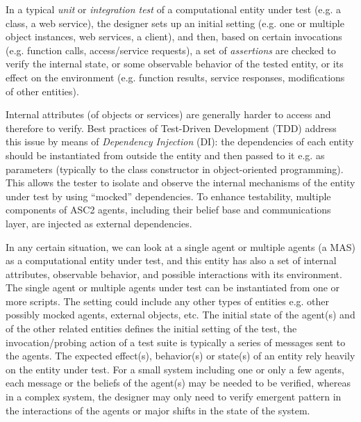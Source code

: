 
In a typical \textit{unit} or \textit{integration test} of a computational entity under test (e.g. a class, a web service), the designer sets up an initial setting (e.g. one or multiple object instances, web services, a client), and then, based on certain invocations (e.g. function calls, access/service requests), a set of \textit{assertions} are checked to verify the internal state, or some observable behavior of the tested entity, or its effect on the environment (e.g. function results, service responses, modifications of other entities). 

Internal attributes (of objects or services) are generally harder to access and therefore to verify. Best practices of Test-Driven Development (TDD) address this issue by means of \textit{Dependency Injection} (DI): the dependencies of each entity should be instantiated from outside the entity and then passed to it e.g. as parameters (typically to the class constructor in object-oriented programming). %
This allows the tester to isolate and observe the internal mechanisms of the entity under test by using ``mocked'' dependencies. 
To enhance testability, multiple components of ASC2 agents, including their belief base and communications layer, are injected as external dependencies.

In any certain situation, we can look at a single agent or multiple agents (a MAS) as a computational entity under test, and this entity has also a set of internal attributes, observable behavior, and possible interactions with its environment. The single agent or multiple agents under test can be instantiated from one or more scripts. The setting could include any other types of entities e.g. other possibly mocked agents, external objects, etc. The initial state of the agent(s) and of the other related entities defines the initial setting of the test, the invocation/probing action of a test suite is typically a series of messages sent to the agents. The expected effect(s), behavior(s) or state(s) of an entity rely heavily on the entity under test. For a small system including one or only a few agents, each message or the beliefs of the agent(s) may be needed to be verified, whereas in a complex system, the designer may only need to verify emergent pattern in the interactions of the agents or major shifts in the state of the system.


